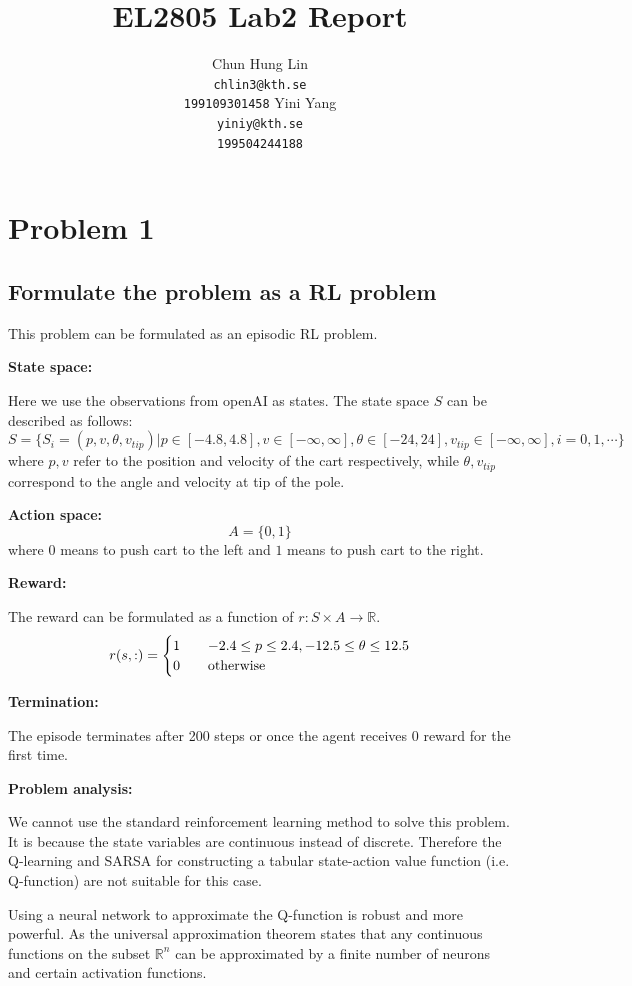 \documentclass{article}
\title{EL2805 Lab2 Report}
\author{
  Chun Hung Lin \\
  \texttt{chlin3@kth.se} \\
  \texttt{199109301458}
  \And
  Yini Yang \\
  \texttt{yiniy@kth.se} \\
  \texttt{199504244188}
}
\begin{document}
\maketitle

\section{Problem 1}

\subsection{Formulate the problem as a RL problem}

This problem can be formulated as an episodic RL problem.

\textbf{State space:}

Here we use the observations from openAI as states. The state space $S$ can be described as follows:
$$ S = \{S_i=(p,v,\theta,v_{tip})|p\in[-4.8,4.8],v\in[-\infty,\infty],\theta\in[-24,24],v_{tip}\in[-\infty,\infty],i=0,1,\cdots\}$$
where $p,v$ refer to the position and velocity of the cart respectively, while $\theta,v_{tip}$ correspond to the angle and velocity at tip of the pole.

\textbf{Action space:}
$$A=\{0,1\}$$
where $0$ means to push cart to the left and $1$ means to push cart to the right.

\textbf{Reward:}

The reward can be formulated as a function of $r: S\times A\rightarrow \mathbb{R}$.
\begin{equation*}
  r(s, :) =
  \begin{cases}
    1  \quad &-2.4\leq p\leq 2.4, -12.5\leq \theta \leq 12.5\\
    0    \quad &\textup{otherwise}
  \end{cases}
\end{equation*}

\textbf{Termination:}

The episode terminates after 200 steps or once the agent receives 0 reward for the first time.

\textbf{Problem analysis:}

We cannot use the standard reinforcement learning method to solve this problem.
It is because the state variables are continuous instead of discrete.
Therefore the Q-learning and SARSA for constructing a tabular state-action value function (i.e. Q-function)
are not suitable for this case.

Using a neural network to approximate the Q-function is robust and more powerful.
As the universal approximation theorem states that any continuous functions on the subset $\mathbb R^n$
can be approximated by a finite number of neurons and certain activation functions.
\end{document}
